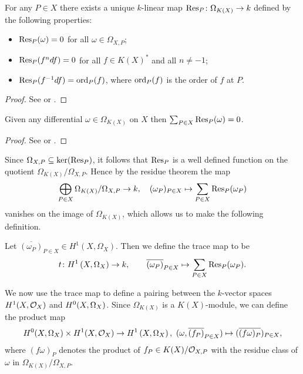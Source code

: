     \begin{thm}\label{theoremresiduemap}
    For any $P\in X$ there exists a unique $k$-linear map $\operatorname{Res}_P \colon \Omega_{K(X)} \rightarrow k$ defined by the following properties:
        \begin{itemize}
            \item $\operatorname{Res}_P(\omega) = 0$ for all $\omega \in \Omega_{X,P}$;
            \item $\operatorname{Res}_P(f^ndf) = 0$ for all $f \in K(X)^*$ and all $n \neq -1$;
            \item $\operatorname{Res}_P(f^{-1}df) = \operatorname{ord}_P(f)$, where $\operatorname{ord}_P(f)$ is the order of $f$ at $P$.
        \end{itemize}
    \end{thm}
    \begin{proof}
    See \cite[Chap.\ II, \S 7 and \S 11]{algebraicgroupsandclassfields} or \cite{residuesofdifferentialsoncurve}.
    \end{proof}


    \begin{thm}\label{theoremresiduetheorem}
    Given any differential $\omega \in \Omega_{K(X)}$ on $X$ then $\sum_{P \in X}\operatorname{Res}_P(\omega) = 0$.
    \end{thm}
    \begin{proof}
    See \cite[Chap.\ II, Prop.\ 6]{algebraicgroupsandclassfields} or \cite[Pg.\ 155]{residuesofdifferentialsoncurve}.
    \end{proof}

Since $\Omega_{X,P} \subseteq \ker (\operatorname{Res}_P)$, it follows that $\operatorname{Res}_P$ is a well defined function on the quotient $\Omega_{K(X)}/\Omega_{X,P}$.
Hence by the residue theorem the map
    \begin{equation*} 
    \bigoplus_{P \in X} \Omega_{K(X)}/\Omega_{X,P} \rightarrow k, \quad (\omega_P)_{P \in X} \mapsto \sum_{P\in X} \operatorname{Res}_P(\omega_P)
    \end{equation*} 
vanishes on the image of $\Omega_{K(X)}$, which allows us to make the following definition.
    
    \begin{defn}
    Let $\overline{(\omega_P)}_{P \in X} \in H^1(X,\Omega_X)$.
    Then we define the trace map to be 
        \[
    t \colon H^1\left(X, \Omega_X\right) \rightarrow k, \qquad \overline{(\omega_P)}_{P \in X}  \mapsto \sum_{P \in X} \operatorname{Res}_P(\omega_P).
        \]
    \end{defn}

We now use the trace map to define a pairing between the $k$-vector spaces $H^1(X,\mathcal{O}_X)$ and ${H^0(X,\Omega_X)}$.
Since $\Omega_{K(X)}$ is a $K(X)$-module, we can define the product map 
    \begin{equation}\label{equationproductmap}
    {H^0(X,\Omega_X)} \times H^1(X,\mathcal{O}_X) \rightarrow H^1\left(X, \Omega_X\right), \ (\omega, \overline{(f_P)}_{P \in X}) \mapsto ( \overline {(f  \omega)_P})_{P \in X},
    \end{equation}
where $(f\omega)_P$ denotes the product of $f_P \in K(X)/{\cal O}_{X,P}$ with the residue class of $\omega$ in $\Omega_{K(X)}/\Omega_{X,P}$.


